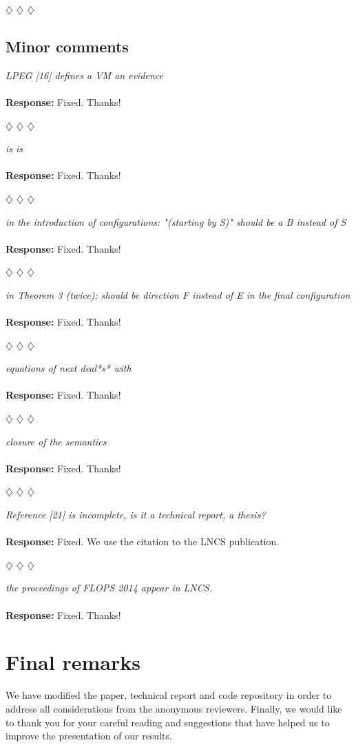 \documentclass{article}
\newcommand{\separador}{\begin{center}
$\diamondsuit$ $\diamondsuit$ $\diamondsuit$
\end{center}}
\begin{document}
\separador

\subsection*{Minor comments}

\noindent\textit{LPEG [16] defines a VM an evidence}
\\
\\
\noindent\textbf{Response:} Fixed. Thanks!

\separador

\noindent\textit{is is}
\\
\\
\noindent\textbf{Response:} Fixed. Thanks!

\separador

\noindent\textit{in the introduction of configurations: "(starting by S)" should be a B instead of S}
\\
\\
\noindent\textbf{Response:} Fixed. Thanks!

\separador

\noindent\textit{in Theorem 3 (twice): should be direction F instead of E in the final configuration}
\\
\\
\noindent\textbf{Response:} Fixed. Thanks!

\separador

\noindent\textit{equations of next deal*s* with}
\\
\\
\noindent\textbf{Response:} Fixed. Thanks!

\separador

\noindent\textit{closure of the semantics}
\\
\\
\noindent\textbf{Response:} Fixed. Thanks!

\separador

\noindent\textit{Reference [21] is incomplete, is it a technical report, a thesis?}
\\
\\
\noindent\textbf{Response:} Fixed. We use the citation to the LNCS publication.

\separador

\noindent\textit{the proceedings of FLOPS 2014 appear in LNCS.}
\\
\\
\noindent\textbf{Response:} Fixed. Thanks!


\section*{Final remarks}

We have modified the paper, technical report and code repository in order to address all considerations
from the anonymous reviewers. Finally, we would like to thank you for your careful reading and suggestions
that have helped us to improve the presentation of our results.




\end{document}
